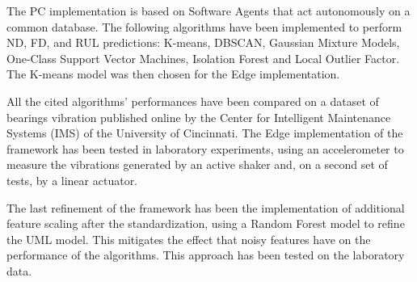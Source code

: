 The PC implementation is based on Software Agents that act autonomously on a common database. The following algorithms have been implemented to perform ND, FD, and RUL predictions: K-means, DBSCAN, Gaussian Mixture Models, One-Class Support Vector Machines, Isolation Forest and Local Outlier Factor. The K-means model was then chosen for the Edge implementation.

All the cited algorithms' performances have been compared on a dataset of bearings vibration published online by the Center for Intelligent Maintenance Systems (IMS) of the University of Cincinnati. The Edge implementation of the framework has been tested in laboratory experiments, using an accelerometer to measure the vibrations generated by an active shaker and, on a second set of tests, by a linear actuator.

The last refinement of the framework has been the implementation of additional feature scaling after the standardization, using a Random Forest model to refine the UML model. This mitigates the effect that noisy features have on the performance of the algorithms. This approach has been tested on the laboratory data.